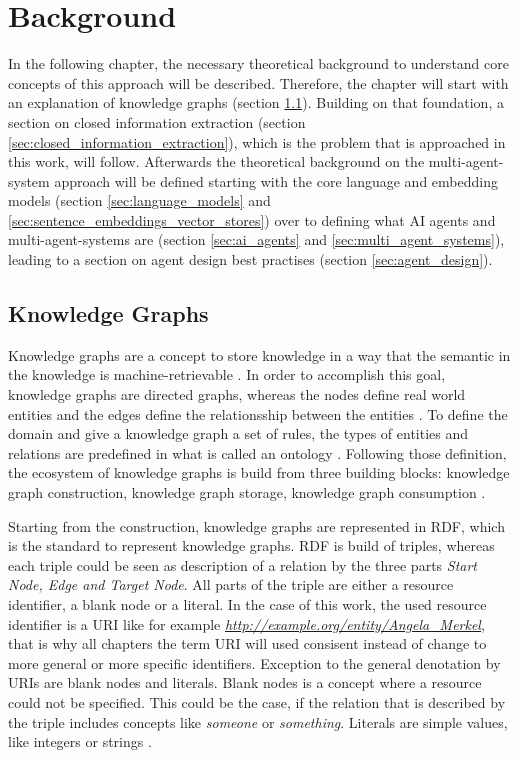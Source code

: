 \documentclass[a4paper,oneside,bibliography=totoc]{scrbook}
\begin{document}
\chapter{Background}
\label{ch:related_work}
In the following chapter, the necessary theoretical background to understand core concepts of this approach will be described. Therefore, the chapter will start with an explanation of knowledge graphs (section \ref{sec:knowledge_graphs}). Building on that foundation, a section on closed information extraction (section \ref{sec:closed_information_extraction}), which is the problem that is approached in this work, will follow. Afterwards the theoretical background on the multi-agent-system approach will be defined starting with the core language and embedding models (section \ref{sec:language_models} and \ref{sec:sentence_embeddings_vector_stores}) over to defining what AI agents and multi-agent-systems are (section \ref{sec:ai_agents} and \ref{sec:multi_agent_systems}), leading to a section on agent design best practises (section \ref{sec:agent_design}).
\section{Knowledge Graphs}
\label{sec:knowledge_graphs}
Knowledge graphs are a concept to store knowledge in a way that the semantic in the knowledge is machine-retrievable \cite{GomezPerez2017}. In order to accomplish this goal, knowledge graphs are directed graphs, whereas the nodes define real world entities and the edges define the relationsship between the entities \cite{Paulheim2016}. To define the domain and give a knowledge graph a set of rules, the types of entities and relations are predefined in what is called an ontology \cite{GomezPerez2017,Paulheim2016}. Following those definition, the ecosystem of knowledge graphs is build from three building blocks: knowledge graph construction, knowledge graph storage, knowledge graph consumption \cite{GomezPerez2017}.

Starting from the construction, knowledge graphs are represented in \ac{RDF}, which is the standard to represent knowledge graphs. \ac{RDF} is build of triples, whereas each triple could be seen as description of a relation by the three parts \textit{Start Node, Edge and Target Node}. All parts of the triple are either a resource identifier, a blank node or a literal. In the case of this work, the used resource identifier is a \ac{URI} like for example \textit{\url{http://example.org/entity/Angela_Merkel}}, that is why all chapters the term \ac{URI} will used consisent instead of change to more general or more specific identifiers. Exception to the general denotation by \acp{URI} are blank nodes and literals. Blank nodes is a concept where a resource could not be specified. This could be the case, if the relation that is described by the triple includes concepts like \textit{someone} or \textit{something}. Literals are simple values, like integers or strings \cite{VillazonTerrazas2017}.
\end{document}
